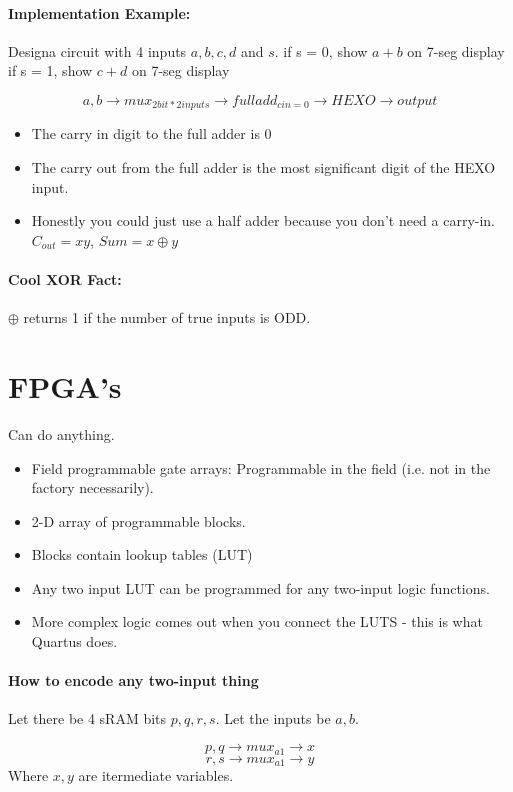 \documentclass[a4paper,12pt]{report}
\begin{document}
\paragraph{Implementation Example: }
Designa  circuit with 4 inputs $a, b, c, d$ and $s$. 
   if s = 0, show $a+b$ on 7-seg display
   if s = 1, show $c+d$ on 7-seg display

$${a, b} \to mux_{2 bit * 2 inputs} \to fulladd_{cin = 0} \to HEXO \to output$$

\begin{itemize}
\item The carry in digit to the full adder is 0
\item The carry out from the full adder is the most significant digit of the HEXO input.
\item Honestly you could just use a half adder because you don't need a carry-in. 
$C_{out} = xy$, $Sum = x \oplus y$
\end{itemize}

\paragraph{Cool XOR Fact: } $\oplus$ returns 1 if the number of true inputs is ODD.

\section{FPGA's}
Can do anything.
\begin{itemize}
\item Field programmable gate arrays: Programmable in the field (i.e. not in the factory necessarily).
\item 2-D array of programmable blocks.
\item Blocks contain lookup tables (LUT)
\item Any two input LUT can be programmed for any two-input logic functions.
\item More complex logic comes out when you connect the LUTS - this is what Quartus does. 
\end{itemize}

\paragraph{How to encode any two-input thing}
Let there be 4 sRAM bits $p, q, r, s$. Let the inputs be $a, b$. 

$${p, q} \to mux_{a1} \to x$$
$${r, s} \to mux_{a1} \to y$$
Where $x, y$ are itermediate variables.
\end{document}

